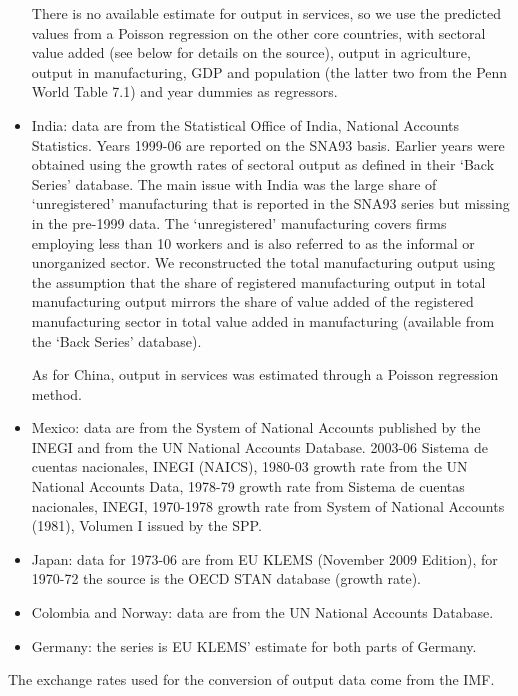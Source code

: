 \documentclass[12pt]{article}
\begin{document}
\begin{itemize}
There is no available estimate for output in services, so we use the
predicted values from a Poisson regression on the other core countries, with
sectoral value added (see below for details on the source), output in
agriculture, output in manufacturing, GDP and population (the latter two
from the Penn World Table 7.1) and year dummies as regressors.

\item India: data are from the Statistical Office of India, National
Accounts Statistics. Years 1999-06 are reported on the SNA93 basis. Earlier
years were obtained using the growth rates of sectoral output as defined in
their `Back Series' database. The main issue with India was the large share
of `unregistered' manufacturing that is reported in the SNA93 series but
missing in the pre-1999 data. The `unregistered' manufacturing covers firms
employing less than 10 workers and is also referred to as the informal or
unorganized sector. We reconstructed the total manufacturing output using
the assumption that the share of registered manufacturing output in total
manufacturing output mirrors the share of value added of the registered
manufacturing sector in total value added in manufacturing (available from
the `Back Series' database).

As for China, output in services was estimated through a Poisson regression
method.

\item Mexico: data are from the System of National Accounts published by the
INEGI and from the UN National Accounts Database. 2003-06 Sistema de cuentas
nacionales, INEGI (NAICS), 1980-03 growth rate from the UN National Accounts
Data, 1978-79 growth rate from Sistema de cuentas nacionales, INEGI,
1970-1978 growth rate from System of National Accounts (1981), Volumen I
issued by the SPP.

\item Japan: data for 1973-06 are from EU KLEMS (November 2009 Edition), for
1970-72 the source is the OECD STAN database (growth rate).

\item Colombia and Norway: data are from the UN National Accounts Database.

\item Germany: the series is EU KLEMS' estimate for both parts of Germany.
\end{itemize}

The exchange rates used for the conversion of output data come from the IMF.
\end{document}
